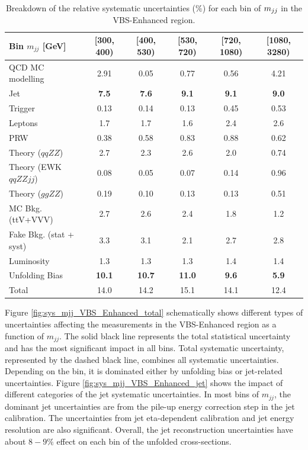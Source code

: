 \begin{table}
\centering
\begin{tabular}{| l || c | c | c | c | c | }
\hline \hline
Bin $m_{jj}$ [GeV] & [300, 400) & [400, 530) & [530, 720) & [720, 1080) & [1080, 3280)\\
\hline
QCD MC modelling & 2.91 & 0.05 & 0.77 & 0.56 & 4.21 \\
Jet & \textbf{7.5} & \textbf{7.6} & \textbf{9.1} & \textbf{9.1} & \textbf{9.0}\\
Trigger & 0.13 & 0.14 & 0.13 & 0.45 & 0.53\\
Leptons & 1.7 & 1.7 & 1.6 & 2.4 & 2.6 \\
PRW & 0.38 & 0.58 & 0.83 & 0.88 & 0.62\\
Theory ($qqZZ$) & 2.7 & 2.3 & 2.6 & 2.0 & 0.74\\
Theory (EWK $qqZZjj$) & 0.08 & 0.05 & 0.07 & 0.14 & 0.96\\
Theory ($ggZZ$) & 0.19 & 0.10 & 0.13 & 0.13 & 0.51\\
MC Bkg. (ttV+VVV) & 2.7 & 2.6 & 2.4 & 1.8 & 1.2\\
Fake Bkg. (stat + syst) & 3.3 & 3.1 & 2.1 & 2.7 & 2.8\\
Luminosity & 1.3 & 1.3 & 1.3 & 1.4 & 1.4\\
Unfolding Bias & \textbf{10.1} & \textbf{10.7} & \textbf{11.0} & \textbf{9.6} & \textbf{5.9}\\
\hline
Total & 14.0 & 14.2 & 15.1 & 14.1 & 12.4\\
\hline
\end{tabular}
\caption{Breakdown of the relative systematic uncertainties ($\%$) for each bin of $m_{jj}$ in the VBS-Enhanced region. \label{tab:systematics_mjj_VBS_Enhanced}}
\end{table}

Figure \ref{fig:sys_mjj_VBS_Enhanced_total} schematically shows different types of uncertainties affecting the measurements in the VBS-Enhanced region as a function of $m_{jj}$. The solid black line represents the total statistical uncertainty and has the most significant impact in all bins. Total systematic uncertainty, represented by the dashed black line, combines all systematic uncertainties. Depending on the bin, it is dominated either by unfolding bias or jet-related uncertainties. Figure \ref{fig:sys_mjj_VBS_Enhanced_jet} shows the impact of different categories of the jet systematic uncertainties. In most bins of $m_{jj}$, the dominant jet uncertainties are from the pile-up energy correction step in the jet calibration. The uncertainties from jet eta-dependent calibration and jet energy resolution are also significant. Overall, the jet reconstruction uncertainties have about $8-9\%$ effect on each bin of the unfolded cross-sections.

